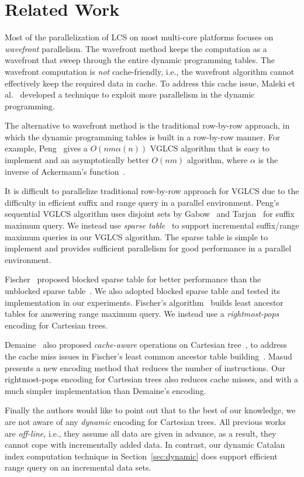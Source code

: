 \section{Related Work} \label{sec:RelatedWork}

Most of the parallelization of LCS on most multi-core platforms
focuses on {\em wavefront} parallelism.  The wavefront method keeps
the computation as a wavefront that sweep through the entire dynamic
programming tables.  The wavefront computation is {\em not}
cache-friendly, i.e., the wavefront algorithm cannot effectively keep
the required data in cache.  To address this cache issue, Maleki et
al.~\cite{Maleki2016EfficientPU} developed a technique to exploit more
parallelism in the dynamic programming.

The alternative to wavefront method is the traditional row-by-row
approach, in which the dynamic programming tables is built in a
row-by-row manner.  For example, Peng~\cite{Peng2011TheLC} gives a
$O(nm \alpha(n))$ VGLCS algorithm that is easy to implement and an
asymptotically better $O(nm)$ algorithm, where $\alpha$ is the inverse
of Ackermann's function~\cite{Banachowski1980ACT}.

It is difficult to parallelize traditional row-by-row approach for VGLCS
due to the difficulty in efficient suffix and range query in a parallel
environment.  Peng's sequential VGLCS algorithm uses disjoint sets by
Gabow~\cite{Gabow1983ALA} and Tarjan~\cite{Tarjan1975EfficiencyOA} for
suffix maximum query.  We instead use {\em sparse
table}~\cite{Berkman1993RecursiveSP} to support incremental suffix/range
maximum queries in our VGLCS algorithm.  The sparse table is simple to
implement and provides sufficient parallelism for good performance in a
parallel environment.

Fischer~\cite{Fischer2006TheoreticalAP} proposed blocked sparse table
for better performance than the unblocked sparse
table~\cite{Berkman1993RecursiveSP}.  We also adopted blocked sparse
table and tested its implementation in our experiments.  Fischer's
algorithm~\cite{Fischer2006TheoreticalAP} builds least ancestor tables
for answering range maximum query.  We instead use a {\em
rightmost-pops} encoding for Cartesian trees.

Demaine~\cite{Demaine2009OnCT} also proposed {\em cache-aware}
operations on Cartesian tree~\cite{Vuillemin1980AUL}, to address the
cache miss issues in Fischer's least common ancestor table
building~\cite{Fischer2006TheoreticalAP}.  Masud~\cite{Hasan2010CacheOA}
presents a new encoding method that reduces the number of instructions.
Our rightmost-pops encoding for Cartesian trees also reduces cache
misses, and with a much simpler implementation than Demaine's encoding.

Finally the authors would like to point out that to the best of our
knowledge, we are not aware of any {\em dynamic} encoding for Cartesian
trees.  All previous works are {\em off-line}, i.e., they assume all
data are given in advance, as a result, they cannot cope with
incrementally added data.  In contrast, our dynamic Catalan index
computation technique in Section~\ref{sec:dynamic} does support
efficient range query on an incremental data sets.
